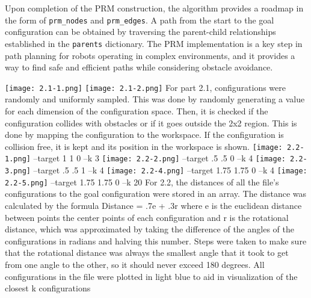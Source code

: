 \documentclass{article}
\begin{document}
Upon completion of the PRM construction, the algorithm provides a roadmap in the form of \texttt{prm\_nodes} and \texttt{prm\_edges}. A path from the start to the goal configuration can be obtained by traversing the parent-child relationships established in the \texttt{parents} dictionary. The PRM implementation is a key step in path planning for robots operating in complex environments, and it provides a way to find safe and efficient paths while considering obstacle avoidance.


\newline
\texttt{[image: 2.1-1.png]}
\texttt{[image: 2.1-2.png]}
For part 2.1, configurations were randomly and uniformly sampled. This was done by randomly generating a value for each dimension of the configuration space. Then, it is checked if the configuration collides with obstacles or if it goes outside the 2x2 region. This is done by mapping the configuration to the workspace. If the configuration is collision free, it is kept and its position in the workspace is shown.
\newline
\texttt{[image: 2.2-1.png]}
--target 1 1 0 --k 3
\newline
\texttt{[image: 2.2-2.png]}
--target .5 .5 0 --k 4
\newline
\texttt{[image: 2.2-3.png]}
--target .5 .5 1 --k 4
\newline
\texttt{[image: 2.2-4.png]}
--target 1.75 1.75 0 --k 4
\newline
\texttt{[image: 2.2-5.png]}
--target 1.75 1.75 0 --k 20
\newline
For 2.2, the distances of all the file's configurations to the goal configuration were stored in an array. The distance was calculated by the formula Distance = .7e + .3r where e is the euclidean distance between points the center points of each configuration and r is the rotational distance, which was approximated by taking the difference of the angles of the configurations in radians and halving this number. Steps were taken to make sure that the rotational distance was always the smallest angle that it took to get from one angle to the other, so it should never exceed 180 degrees. All configurations in the file were plotted in light blue to aid in visualization of the closest k configurations
\newline
\end{document}
